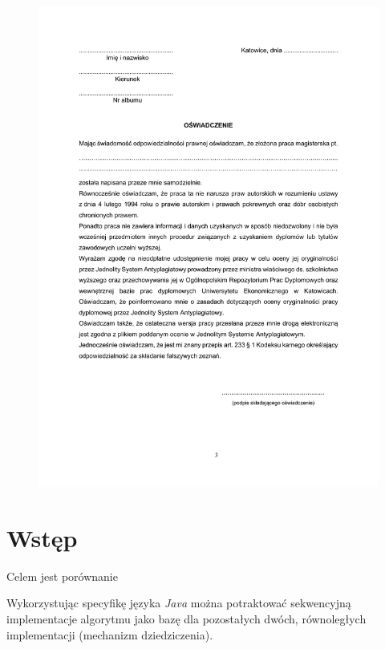 \documentclass[12pt]{article}
\begin{document}
\begin{figure}[H]
    \centering
	\includegraphics[width=\paperwidth,height=\paperheight,keepaspectratio]{plagiat.pdf}
\end{figure}
\newpage

\restoregeometry

\tableofcontents
\newpage

\cleardoublepage
{}
{}
\section*{Wstęp}
Celem jest porównanie 

Wykorzystując specyfikę języka \textit{Java} można potraktować sekwencyjną implementacje algorytmu
jako bazę dla pozostałych dwóch, równoległych implementacji (mechanizm dziedziczenia).  
\end{document}
